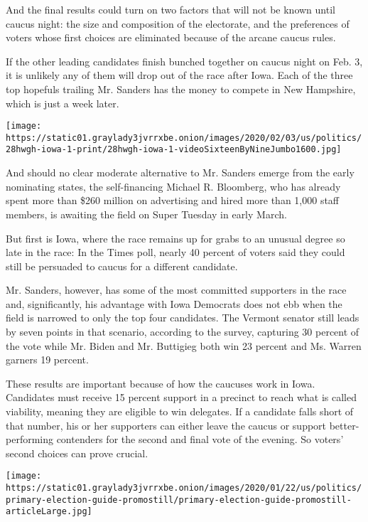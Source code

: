 And the final results could turn on two factors that will not be known
until caucus night: the size and composition of the electorate, and the
preferences of voters whose first choices are eliminated because of the
arcane caucus rules.

If the other leading candidates finish bunched together on caucus night
on Feb. 3, it is unlikely any of them will drop out of the race after
Iowa. Each of the three top hopefuls trailing Mr. Sanders has the money
to compete in New Hampshire, which is just a week later.

\texttt{[image: https://static01.graylady3jvrrxbe.onion/images/2020/02/03/us/politics/28hwgh-iowa-1-print/28hwgh-iowa-1-videoSixteenByNineJumbo1600.jpg]}

And should no clear moderate alternative to Mr. Sanders emerge from the
early nominating states, the self-financing Michael R. Bloomberg, who
has already spent more than \$260 million on advertising and hired more
than 1,000 staff members, is awaiting the field on Super Tuesday in
early March.

But first is Iowa, where the race remains up for grabs to an unusual
degree so late in the race: In the Times poll, nearly 40 percent of
voters said they could still be persuaded to caucus for a different
candidate.

Mr. Sanders, however, has some of the most committed supporters in the
race and, significantly, his advantage with Iowa Democrats does not ebb
when the field is narrowed to only the top four candidates. The Vermont
senator still leads by seven points in that scenario, according to the
survey, capturing 30 percent of the vote while Mr. Biden and Mr.
Buttigieg both win 23 percent and Ms. Warren garners 19 percent.

These results are important because of how the caucuses work in Iowa.
Candidates must receive 15 percent support in a precinct to reach what
is called viability, meaning they are eligible to win delegates. If a
candidate falls short of that number, his or her supporters can either
leave the caucus or support better-performing contenders for the second
and final vote of the evening. So voters' second choices can prove
crucial.

\href{https://www.nytimes3xbfgragh.onion/interactive/2020/01/24/us/politics/presidential-primary-election-guide.html}{}

\texttt{[image: https://static01.graylady3jvrrxbe.onion/images/2020/01/22/us/politics/primary-election-guide-promostill/primary-election-guide-promostill-articleLarge.jpg]}

